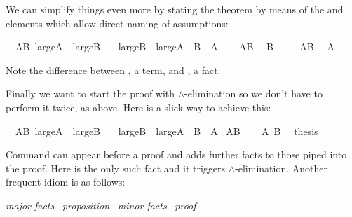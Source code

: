 \begin{isabellebody}
\begin{isamarkuptext}
We can simplify things even more by stating the theorem by means of the
 and  elements which allow direct
naming of assumptions:%
\end{isamarkuptext}%
\isamarkuptrue%
\ \ AB{\isacharcolon}\ {\isachardoublequote}large{\isacharunderscore}A\ {\isasymand}\ large{\isacharunderscore}B{\isachardoublequote}\isanewline
\ \ \ {\isachardoublequote}large{\isacharunderscore}B\ {\isasymand}\ large{\isacharunderscore}A{\isachardoublequote}\ {\isacharparenleft}\ {\isachardoublequote}{\isacharquery}B\ {\isasymand}\ {\isacharquery}A{\isachardoublequote}{\isacharparenright}\isanewline
\isamarkupfalse%
\isanewline
\ \ \isamarkupfalse%
\ AB\ \isamarkupfalse%
\ {\isachardoublequote}{\isacharquery}B{\isachardoublequote}\ \isamarkupfalse%
\isacommand{{\isachardot}{\isachardot}}\isanewline
\isamarkupfalse%
\isanewline
\ \ \isamarkupfalse%
\ AB\ \isamarkupfalse%
\ {\isachardoublequote}{\isacharquery}A{\isachardoublequote}\ \isamarkupfalse%
\isacommand{{\isachardot}{\isachardot}}\isanewline
\isamarkupfalse%
\isamarkupfalse%
%
\begin{isamarkuptext}%
\noindent Note the difference between , a term, and
, a fact.

Finally we want to start the proof with $\land$-elimination so we
don't have to perform it twice, as above. Here is a slick way to
achieve this:%
\end{isamarkuptext}%
\isamarkuptrue%
\ \ AB{\isacharcolon}\ {\isachardoublequote}large{\isacharunderscore}A\ {\isasymand}\ large{\isacharunderscore}B{\isachardoublequote}\isanewline
\ \ \ {\isachardoublequote}large{\isacharunderscore}B\ {\isasymand}\ large{\isacharunderscore}A{\isachardoublequote}\ {\isacharparenleft}\ {\isachardoublequote}{\isacharquery}B\ {\isasymand}\ {\isacharquery}A{\isachardoublequote}{\isacharparenright}\isanewline
\isamarkupfalse%
\ AB\isanewline
\isamarkupfalse%
\isanewline
\ \ \isamarkupfalse%
\ {\isachardoublequote}{\isacharquery}A{\isachardoublequote}\ {\isachardoublequote}{\isacharquery}B{\isachardoublequote}\ \isamarkupfalse%
\ {\isacharquery}thesis\ \isamarkupfalse%
\isacommand{{\isachardot}{\isachardot}}\isanewline
\isamarkupfalse%
\isamarkupfalse%
%
\begin{isamarkuptext}%
\noindent Command  can appear before a proof
and adds further facts to those piped into the proof. Here 
is the only such fact and it triggers $\land$-elimination. Another
frequent idiom is as follows:
\begin{center}
 \emph{major-facts}~
 \emph{proposition}~
 \emph{minor-facts}~
\emph{proof}
\end{center}


\end{isamarkuptext}
\end{isabellebody}
